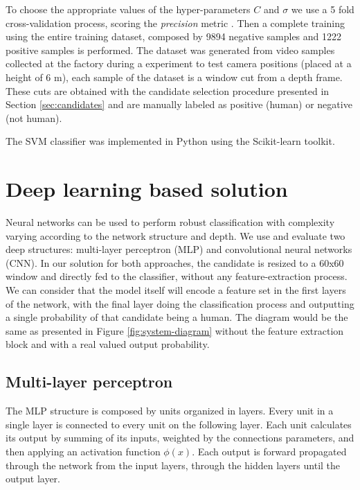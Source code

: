       To choose the appropriate values of the hyper-parameters $C$ and $\sigma$ we use a 5 fold cross-validation process, scoring the \textit{precision} metric \cite{evaluationMetrics}. Then a complete training using the entire training dataset, composed by 9894 negative samples and 1222 positive samples is performed. The dataset was generated from video samples collected at the factory during a experiment to test camera positions (placed at a height of 6 m), each sample of the dataset is a window cut from a depth frame. These cuts are obtained with the candidate selection procedure presented in Section \ref{sec:candidates} and are manually labeled as positive (human) or negative (not human).

      The SVM classifier was implemented in Python using the Scikit-learn \cite{scikit-learn} toolkit.


\section{Deep learning based solution}
\label{sec:deep}

    Neural networks can be used to perform robust classification with complexity varying according to the network structure and depth. We use and evaluate two deep structures: multi-layer perceptron (MLP) and convolutional neural networks (CNN). In our solution for both approaches, the candidate is resized to a 60x60 window and directly fed to the classifier, without any feature-extraction process. We can consider that the model itself will encode a feature set in the first layers of the network, with the final layer doing the classification process and outputting a single probability of that candidate being a human. The diagram would be the same as presented in Figure \ref{fig:system-diagram} without the feature extraction block and with a real valued output probability.

    \subsection{Multi-layer perceptron}
        The MLP structure is composed by units organized in layers. Every unit in a single layer is connected to every unit on the following layer. Each unit calculates its output by summing of its inputs, weighted by the connections parameters, and then applying an activation function $\phi(x)$. Each output is forward propagated through the network from the input layers, through the hidden layers until the output layer.


